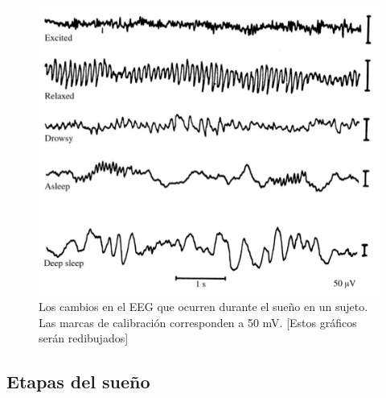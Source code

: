 


\begin{figure}
\centering
\includegraphics[width=0.7\linewidth]{figura_7.png} 
\caption{Los cambios en el EEG que ocurren durante el sue\~no en un sujeto.
Las marcas de calibraci\'on corresponden a 50 mV.
[Estos gr\'aficos ser\'an redibujados]
}
\label{ritmosEEG}
\end{figure}


\subsection{Etapas del sue\~no}

